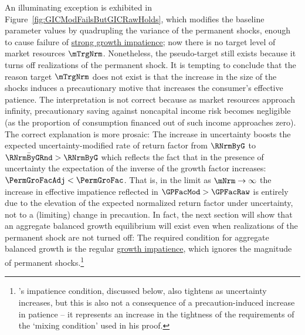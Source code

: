 \documentclass[\econtexRoot/BufferStockTheory]{subfiles}
\begin{document}
\renewcommand{\figFile}{GICModFailsButGICRawHolds}
\hypertarget{\figFile}{}


An illuminating exception is exhibited in Figure~\ref{fig:GICModFailsButGICRawHolds}, which modifies the baseline parameter values by quadrupling the variance of the permanent shocks, enough to cause failure of \hyperlink{GICMod}{strong growth impatience}; now there is no target level of market resources $\mTrgNrm$.
Nonetheless, the pseudo-target still exists because it turns off realizations of the permanent shock.
It is tempting to conclude that the reason target $\mTrgNrm$ does not exist is that the increase in the size of the shocks induces a precautionary motive that increases the consumer's effective patience.
The interpretation is not correct because as market resources approach infinity, precautionary saving against noncapital income risk becomes negligible (as the proportion of consumption financed out of such income approaches zero).
\hypertarget{PermGroFacAdj}{}The correct explanation is more prosaic: The increase in uncertainty boosts the expected uncertainty-modified rate of return factor from $\RNrmByG$ to $\bar{\RNrmByGRnd}>\RNrmByG$ which reflects the fact that in the presence of uncertainty the expectation of the inverse of the growth factor increases: $\PermGroFacAdj < \PermGroFac$.
That is, in the limit as $\mNrm \rightarrow \infty$ the increase in effective impatience reflected in $\GPFacMod > \GPFacRaw$ is entirely due to the elevation of the expected normalized return factor under uncertainty, not to a (limiting) change in precaution.
In fact, the next section will show that an aggregate balanced growth equilibrium will exist even when realizations of the permanent shock are not turned off: The required condition for aggregate balanced growth is the regular \hyperlink{GICRaw}{growth impatience}, which ignores the magnitude of permanent shocks.\footnote{\cite{szeidlInvariant}'s impatience condition, discussed below, also tightens as uncertainty increases, but this is also not a consequence of a precaution-induced increase in patience -- it represents an increase in the tightness of the requirements of the `mixing condition' used in his proof.}


\end{document}
